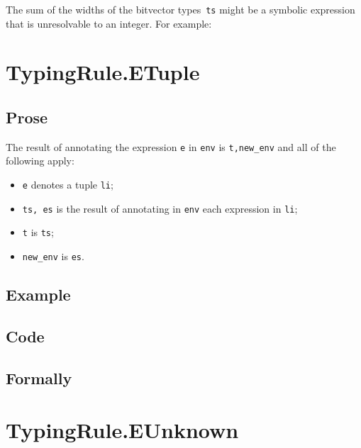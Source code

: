 \documentclass{book}
\begin{document}
  The sum of the widths of the bitvector types~\texttt{ts} might be a symbolic
expression that is unresolvable to an integer. For example:


\section{TypingRule.ETuple \label{sec:TypingRule.ETuple}}

  \subsection{Prose}
  The result of annotating the expression \texttt{e} in \texttt{env} is
\texttt{t,new\_env} and all of the following apply:
  \begin{itemize}
  \item \texttt{e} denotes a tuple \texttt{li};
  \item \texttt{ts, es} is the result of annotating in \texttt{env} each expression in \texttt{li};
  \item \texttt{t} is \texttt{ts};
  \item \texttt{new\_env} is \texttt{es}.
  \end{itemize}

  \subsection{Example}

  \subsection{Code}

\begin{emptyformal}
    \subsection{Formally}
\end{emptyformal}


\section{TypingRule.EUnknown \label{sec:TypingRule.EUnknown}}
\end{document}
